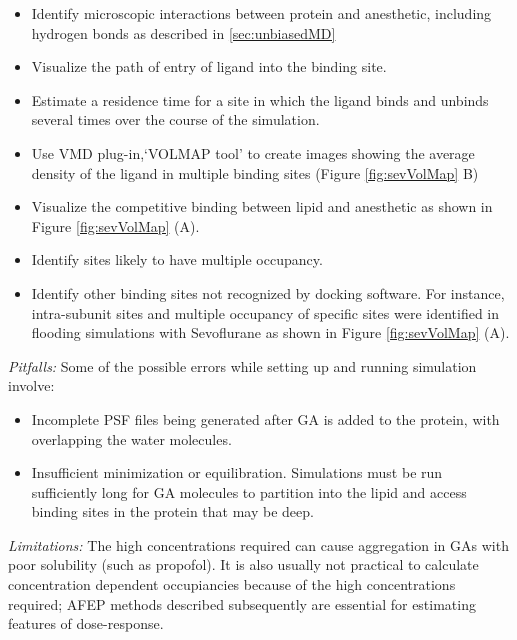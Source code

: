 \documentclass[12pt]{article}
\begin{document}
	\begin{itemize}
	 \item Identify microscopic interactions between protein and anesthetic, including hydrogen bonds 
	 as described in \ref{sec:unbiasedMD}
	 \item Visualize the path of entry of ligand into the binding site.
	 \item Estimate a residence time for a site in which the ligand binds and unbinds several times over the course of the simulation. 
	 \item Use VMD plug-in,`VOLMAP tool'  to create images showing the average density of the ligand in multiple binding sites (Figure \ref{fig:sevVolMap} B)
	 \item Visualize the competitive binding between lipid and anesthetic as shown in Figure \ref{fig:sevVolMap} (A). 
	 \item Identify sites likely to have multiple occupancy.  
	 \item Identify other binding sites not recognized by docking software. For instance, intra-subunit sites and multiple occupancy of specific sites were identified in flooding simulations with Sevoflurane as shown in Figure \ref{fig:sevVolMap} (A).
	\end{itemize}

\textit {Pitfalls:}
	Some of the possible errors while setting up and running simulation involve:
	\begin{itemize}
	 \item Incomplete PSF files being generated after GA is added to the protein, with overlapping the water molecules. 
	 \item Insufficient minimization or equilibration. Simulations must be run sufficiently long for GA molecules to partition into the lipid and access binding sites in the protein that may be deep.  
	 \end{itemize}

 \textit {Limitations:}
 The high concentrations required can cause aggregation in GAs with poor solubility (such as propofol). It is also usually not practical to calculate concentration dependent occupiancies because of the high concentrations required; AFEP methods described subsequently are essential for estimating features of dose-response.  
 
\end{document}
